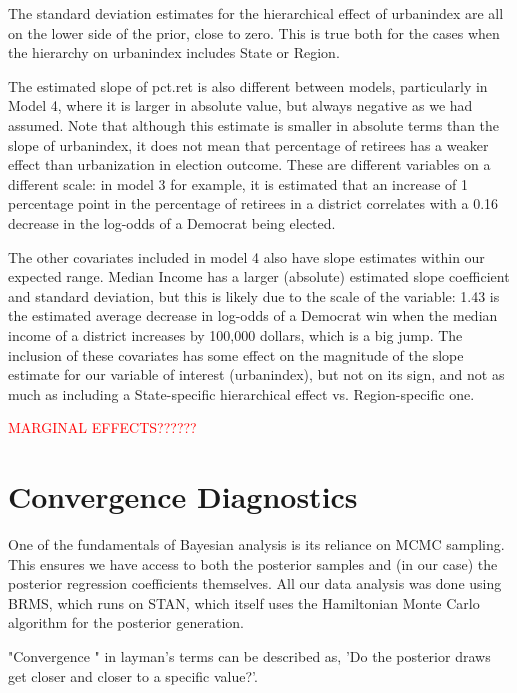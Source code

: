\documentclass[12pt]{article}
\newcommand{\red}[1]{\textcolor{red}{#1}}
\begin{document}
The standard deviation estimates for the hierarchical effect of urbanindex  are all on the lower side of the prior, close to zero. This is true both for the cases when the hierarchy on urbanindex includes State or Region.


The estimated slope of pct.ret is also different between models, particularly in Model 4, where it is larger in absolute value, but always negative as we had assumed. Note that although this estimate is smaller in absolute terms than the slope of urbanindex, it does not mean that percentage of retirees has a weaker effect than urbanization in election outcome. These are different variables on a different scale: in model 3 for example, it is estimated that an increase of 1 percentage point in the percentage of retirees in a district correlates with a 0.16 decrease in the log-odds of a Democrat being elected.

The other covariates included in model 4 also have slope estimates within our expected range.
Median Income has a larger (absolute) estimated slope coefficient and standard deviation, but this is likely due to the scale of the variable: 1.43 is the estimated average decrease in log-odds of a Democrat win when the median income of a district increases by 100,000 dollars, which is a big jump. The inclusion of these covariates has some effect on the magnitude of the slope estimate for our variable of interest (urbanindex), but not on its sign, and not as much as including a State-specific hierarchical effect vs. Region-specific one.



\red{MARGINAL EFFECTS??????}


\section{Convergence Diagnostics}

One of the fundamentals of Bayesian analysis is its reliance on MCMC sampling. This ensures we have access to both the posterior samples and (in our case) the posterior regression coefficients themselves. All our data analysis was done using BRMS, which runs on STAN, which itself uses the Hamiltonian Monte Carlo algorithm for the posterior generation. 

"Convergence " in layman's terms can be described as, 'Do the posterior draws get closer and closer to a specific value?'.
\end{document}
